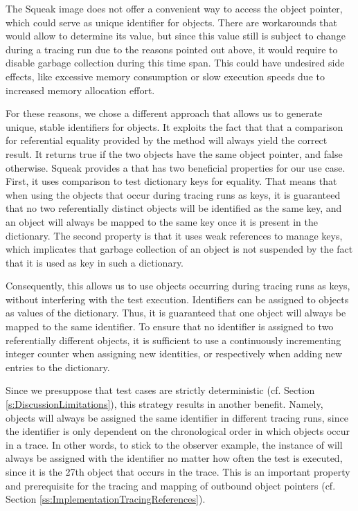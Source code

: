 The Squeak image does not offer a convenient way to access the object pointer, which could serve as unique identifier for objects.
There are workarounds that would allow to determine its value, but since this value still is subject to change during a tracing run due to the reasons pointed out above, it would require to disable garbage collection during this time span.
This could have undesired side effects, like excessive memory consumption or slow execution speeds due to increased memory allocation effort.

For these reasons, we chose a different approach that allows us to generate unique, stable identifiers for objects.
It exploits the fact that that a comparison for referential equality provided by the \inlinecode{==} method will always yield the correct result.
It returns true if the two objects have the same object pointer, and false otherwise.
Squeak provides a  that has two beneficial properties for our use case.
First, it uses \inlinecode{==} comparison to test dictionary keys for equality.
That means that when using the objects that occur during tracing runs as keys, it is guaranteed that no two referentially distinct objects will be identified as the same key, and an object will always be mapped to the same key once it is present in the dictionary.
The second property is that it uses weak references to manage keys, which implicates that garbage collection of an object is not suspended by the fact that it is used as key in such a dictionary.

Consequently, this allows us to use objects occurring during tracing runs as keys, without interfering with the test execution.
Identifiers can be assigned to objects as values of the dictionary.
Thus, it is guaranteed that one object will always be mapped to the same identifier.
To ensure that no identifier is assigned to two referentially different objects, it is sufficient to use a continuously incrementing integer counter when assigning new identities, or respectively when adding new entries to the dictionary.

Since we presuppose that test cases are strictly deterministic (cf. Section \ref{s:DiscussionLimitations}), this strategy results in another benefit.
Namely, objects will always be assigned the same identifier in different tracing runs, since the identifier is only dependent on the chronological order in which objects occur in a trace.
In other words, to stick to the observer example, the instance of  will always be assigned with the identifier  no matter how often the test is executed, since it is the 27th object that occurs in the trace.
This is an important property and prerequisite for the tracing and mapping of outbound object pointers (cf. Section \ref{ss:ImplementationTracingReferences}).

